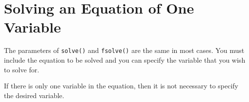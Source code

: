 \section{Solving an Equation of One Variable}
\label{sec:solving_an_equation_of_one_variable}

The parameters of \texttt{solve()} and \texttt{fsolve()} are the same in most cases. You must include the equation to be solved and you can specify the variable that you wish to solve for.

\begin{maplegroup}
\begin{mapleinput}
\end{mapleinput}
\mapleresult
\begin{maplelatex}
\end{maplelatex}
\end{maplegroup}

\begin{maplegroup}
\begin{mapleinput}
\end{mapleinput}
\mapleresult
\begin{maplelatex}
\end{maplelatex}
\end{maplegroup}

If there is only one variable in the equation, then it is not necessary to specify the desired variable.

\begin{maplegroup}
\begin{mapleinput}
\end{mapleinput}
\mapleresult
\begin{maplelatex}
\end{maplelatex}
\end{maplegroup}
\begin{maplegroup}
\begin{mapleinput}
\end{mapleinput}
\mapleresult
\begin{maplelatex}
\end{maplelatex}
\end{maplegroup}

